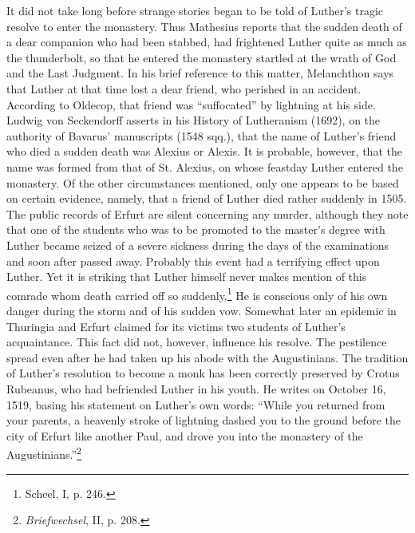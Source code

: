It did not take long before strange stories began to be told of
Luther’s tragic resolve to enter the monastery. Thus Mathesius reports
that the sudden death of a dear companion who had been stabbed, had
frightened Luther quite as much as the thunderbolt, so that he
entered the monastery startled at the wrath of God and the Last
Judgment. In his brief reference to this matter, Melanchthon says
that Luther at that time lost a dear friend, who perished in an
accident. According to Oldecop, that friend was “suffocated” by
lightning at his side. Ludwig von Seckendorff asserts in his History
of Lutheranism (1692), on the authority of Bavarus’ manuscripts
(1548 sqq.), that the name of Luther’s friend who died a sudden death
was Alexius or Alexis. It is probable, however, that the name was
formed from that of St. Alexius, on whose feastday Luther entered
the monastery. Of the other circumstances mentioned, only one appears
to be based on certain evidence, namely, that a friend of Luther
died rather suddenly in 1505. The public records of Erfurt are silent
concerning any murder, although they note that one of the students
who was to be promoted to the master’s degree with Luther became
seized of a severe sickness during the days of the examinations and
soon after passed away. Probably this event had a terrifying
effect upon Luther. Yet it is striking that Luther himself never makes
mention of this comrade whom death carried off so suddenly.\footnote{Scheel, I, p. 246.}
He is conscious only of his own danger during the storm and of his sudden
vow. Somewhat later an epidemic in Thuringia and Erfurt claimed
for its victims two students of Luther’s acquaintance. This fact did
not, however, influence his resolve. The pestilence spread even after
he had taken up his abode with the Augustinians. The tradition of
Luther’s resolution to become a monk has been correctly preserved
by Crotus Rubeanus, who had befriended Luther in his youth. He
writes on October 16, 1519, basing his statement on Luther’s own
words: “While you returned from your parents, a heavenly stroke
of lightning dashed you to the ground before the city of Erfurt like
another Paul, and drove you into the monastery of the Augustinians.”\footnote
{\textit{Briefwechsel}, II, p. 208.}
